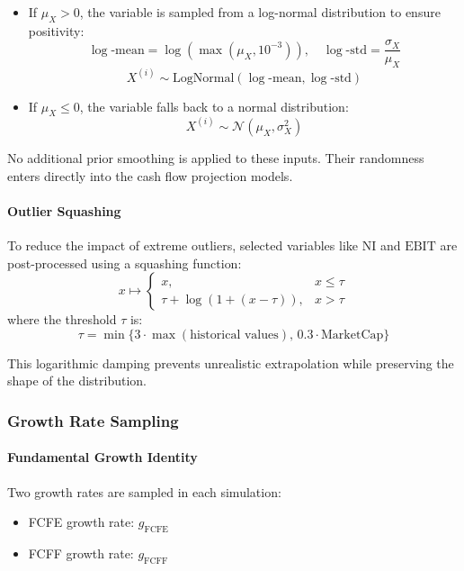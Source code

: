 \begin{itemize}
  \item If $\mu_X > 0$, the variable is sampled from a log-normal distribution to ensure positivity:
  \[
  \log\text{-mean} = \log(\max(\mu_X, 10^{-3})), \quad \log\text{-std} = \frac{\sigma_X}{\mu_X}
  \]
  \[
  X^{(i)} \sim \text{LogNormal}(\log\text{-mean}, \log\text{-std})
  \]

  \item If $\mu_X \leq 0$, the variable falls back to a normal distribution:
  \[
  X^{(i)} \sim \mathcal{N}(\mu_X, \sigma_X^2)
  \]
\end{itemize}

No additional prior smoothing is applied to these inputs. Their randomness enters directly into the cash flow projection models.

\paragraph{Outlier Squashing}

To reduce the impact of extreme outliers, selected variables like $\text{NI}$ and $\text{EBIT}$ are post-processed using a squashing function:
\[
x \mapsto
\begin{cases}
x, & x \leq \tau \\
\tau + \log(1 + (x - \tau)), & x > \tau
\end{cases}
\]
where the threshold $\tau$ is:
\[
\tau = \min\{3 \cdot \max(\text{historical values}), \, 0.3 \cdot \text{MarketCap}\}
\]

This logarithmic damping prevents unrealistic extrapolation while preserving the shape of the distribution.

\subsubsection{Growth Rate Sampling}

\paragraph{Fundamental Growth Identity}

Two growth rates are sampled in each simulation:
\begin{itemize}
  \item FCFE growth rate: $g_{\text{FCFE}}$
  \item FCFF growth rate: $g_{\text{FCFF}}$
\end{itemize}

